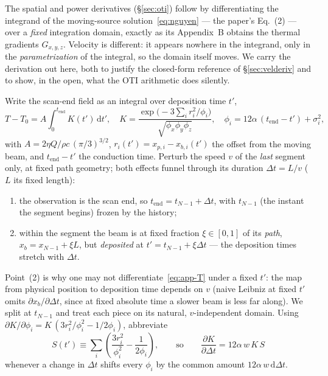 \documentclass[11pt]{article}
\newcommand{\dd}{\mathrm{d}}
\begin{document}
The spatial and power derivatives (\S\ref{sec:oti}) follow by differentiating
the integrand of the moving-source solution~\eqref{eq:nguyen} --- the paper's
Eq.~(2) --- over a \emph{fixed} integration domain, exactly as its Appendix~B
obtains the thermal gradients $G_{x,y,z}$. Velocity is different: it appears
nowhere in the integrand, only in the \emph{parametrization} of the integral,
so the domain itself moves. We carry the derivation out here, both to justify
the closed-form reference of \S\ref{sec:velderiv} and to show, in the open,
what the OTI arithmetic does silently.

Write the scan-end field as an integral over deposition time $t'$,
\begin{equation}
  T - T_0 = A \int_0^{t_{\mathrm{end}}} K(t')\,\dd t',
  \quad
  K = \frac{\exp\!\big(-3\textstyle\sum_i r_i^2/\phi_i\big)}{\sqrt{\phi_x\phi_y\phi_z}},
  \quad
  \phi_i = 12\alpha\,(t_{\mathrm{end}}-t') + \sigma_i^2,
  \label{eq:app-T}
\end{equation}
with $A = 2\eta Q/\rho c\,(\pi/3)^{3/2}$, $r_i(t') = x_{p,i} - x_{b,i}(t')$ the
offset from the moving beam, and $t_{\mathrm{end}}-t'$ the conduction time.
Perturb the speed $v$ of the \emph{last} segment only, at fixed path geometry;
both effects funnel through its duration $\Delta t = L/v$ ($L$ its fixed
length):
\begin{enumerate}
  \item the observation is the scan end, so $t_{\mathrm{end}} = t_{N-1} +
        \Delta t$, with $t_{N-1}$ (the instant the segment begins) frozen by
        the history;
  \item within the segment the beam is at fixed fraction $\xi\in[0,1]$ of its
        \emph{path}, $x_b = x_{N-1} + \xi L$, but \emph{deposited} at
        $t' = t_{N-1} + \xi\Delta t$ --- the deposition times stretch with
        $\Delta t$.
\end{enumerate}
Point~(2) is why one may not differentiate~\eqref{eq:app-T} under a fixed $t'$:
the map from physical position to deposition time depends on $v$ (naive Leibniz
at fixed $t'$ omits $\partial x_b/\partial\Delta t$, since at fixed absolute
time a slower beam is less far along). We split at $t_{N-1}$ and treat each
piece on its natural, $v$-independent domain. Using
$\partial K/\partial\phi_i = K\,(3r_i^2/\phi_i^2 - 1/2\phi_i)$, abbreviate
\begin{equation}
  S(t') \equiv \sum_i \left(\frac{3 r_i^2}{\phi_i^2} - \frac{1}{2\phi_i}\right),
  \qquad\text{so}\qquad
  \frac{\partial K}{\partial \Delta t} = 12\alpha\,w\,K\,S
  \label{eq:app-S}
\end{equation}
whenever a change in $\Delta t$ shifts every $\phi_i$ by the common amount
$12\alpha\,w\,\dd\Delta t$.
\end{document}
